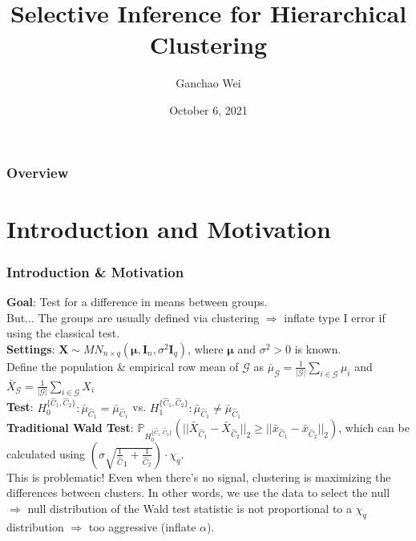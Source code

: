 \documentclass{beamer}
\title[Selective Inference]{Selective Inference for Hierarchical Clustering} %
\author{Ganchao Wei} %
\date{October 6, 2021} %
\begin{document}
	
	\begin{frame}
		\titlepage %
	\end{frame}
	
	\begin{frame}
		\frametitle{Overview} %
		\tableofcontents
	\end{frame}
	
	
	\section{Introduction and Motivation}
	
	\begin{frame}
		\frametitle{Introduction \& Motivation}
		\textbf{Goal}: Test for a difference in means between groups.\\
		But... The groups are usually defined via clustering $\Rightarrow$ inflate type I error if using the classical test.\\
		\textbf{Settings}: $\bm{X}\sim MN_{n\times q}(\bm{\mu}, \bm{I}_n, \sigma^2\bm{I}_q)$, where $\bm{\mu}$ and $\sigma^2>0$ is known.\\
		Define the population \& empirical row mean of $\mathcal{G}$ as $\bar{\mu}_{\mathcal{G}} = \frac{1}{|\mathcal{G}|}\sum_{i\in\mathcal{G}}\mu_i$ and $\bar{X}_{\mathcal{G}} = \frac{1}{|\mathcal{G}|}\sum_{i\in\mathcal{G}}X_i$\\
		\textbf{Test}: $H_0^{\{\hat{C}_1, \hat{C}_2\}}: \bar{\mu}_{\hat{C}_1} = \bar{\mu}_{\hat{C}_1}$ vs. $H_1^{\{\hat{C}_1, \hat{C}_2\}}: \bar{\mu}_{\hat{C}_1} \ne \bar{\mu}_{\hat{C}_1}$\\
		\textbf{Traditional Wald Test}: $\mathbb{P}_{H_0^{\{\hat{C}_1, \hat{C}_2\}}}(||\bar{X}_{\hat{C}_1} - \bar{X}_{\hat{C}_2}||_2 \geq ||\bar{x}_{\hat{C}_1} - \bar{x}_{\hat{C}_2}||_2)$, which can be calculated using $(\sigma\sqrt{\frac{1}{\hat{C}}_1 + \frac{1}{\hat{C}_2}})\cdot\chi_{q}$.\\
		This is problematic! Even when there's no signal, clustering is maximizing the differences between clusters. In other words, we use the data to select the null $\Rightarrow$ null distribution of the Wald test statistic is not proportional to a $\chi_{q}$ distribution $\Rightarrow$ too aggressive (inflate $\alpha$).
		
	\end{frame}
	
\end{document}
